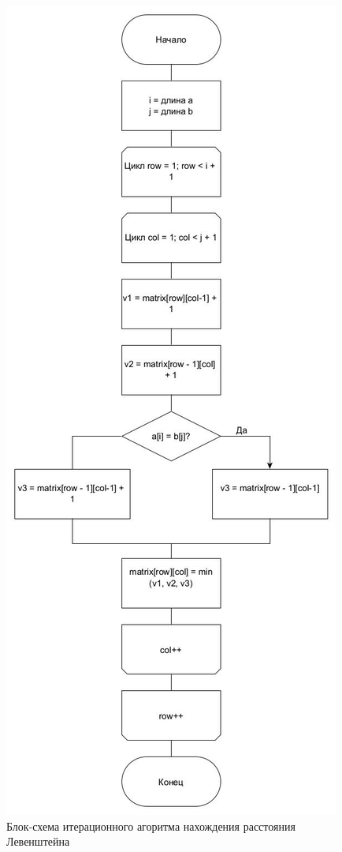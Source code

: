 \documentclass[12pt]{report}
\begin{document}
    \begin{figure}[H]
        \centering
        \includegraphics[width=0.5\linewidth]{img/levCasual}
        \caption{Блок-схема итерационного агоритма нахождения расстояния Левенштейна}
        \label{fig:levCasual}
    \end{figure}
\end{document}
